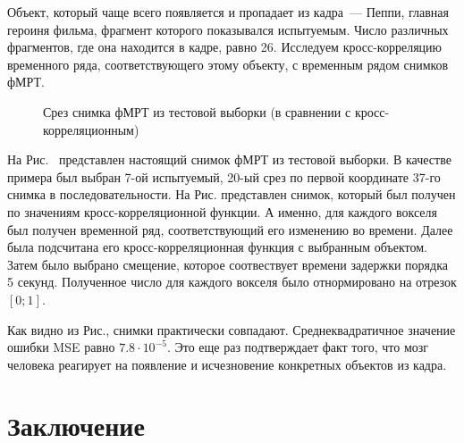 \documentclass[a4paper, 12pt]{extarticle}
\begin{document}
Объект, который чаще всего появляется и пропадает из кадра~--- Пеппи, главная героиня фильма,
фрагмент которого показывался испытуемым. Число различных фрагментов, где она находится в кадре,
равно 26. Исследуем кросс-корреляцию временного ряда, соответствующего этому объекту, с 
временным рядом снимков фМРТ.

\begin{figure}[h!]
	\centering
	\hfill
	\hfill
	\caption{Срез снимка фМРТ из тестовой выборки (в сравнении с кросс-корреляционным)}
	\label{fig:occur}
\end{figure}

На Рис.~ представлен настоящий снимок фМРТ из тестовой выборки. В качестве примера был выбран
7-ой испытуемый, 20-ый срез по первой координате 37-го снимка в последовательности.
На Рис. представлен снимок, который был получен по значениям кросс-корреляционной функции.
А именно, для каждого вокселя был получен временной ряд, соответствующий его изменению во времени.
Далее была подсчитана его кросс-корреляционная функция с выбранным объектом.
Затем было выбрано смещение, которое соотвествует времени задержки порядка 5 секунд.
Полученное число для каждого вокселя было отнормировано на отрезок $[0; 1]$.

Как видно из Рис., снимки практически совпадают. 
Среднеквадратичное значение ошибки MSE равно $7.8 \cdot 10^{-5}$.
Это еще раз подтверждает факт того, что мозг человека реагирует 
на появление и исчезновение конкретных объектов из кадра.

\newpage

\section{Заключение}
\end{document}
